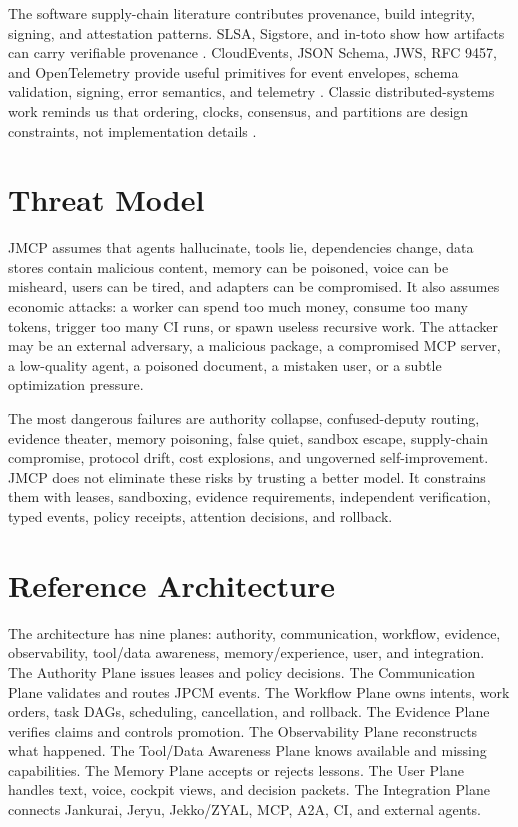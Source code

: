\documentclass[10pt,journal,onecolumn]{IEEEtran}
\begin{document}
The software supply-chain literature contributes provenance, build integrity, signing, and attestation patterns. SLSA, Sigstore, and in-toto show how artifacts can carry verifiable provenance \cite{slsa,sigstore,intoto}. CloudEvents, JSON Schema, JWS, RFC 9457, and OpenTelemetry provide useful primitives for event envelopes, schema validation, signing, error semantics, and telemetry \cite{cloudevents,jsonschema,rfc7515,rfc9457,opentelemetry}. Classic distributed-systems work reminds us that ordering, clocks, consensus, and partitions are design constraints, not implementation details \cite{lamport,paxos,raft,cap}.

\section{Threat Model}
JMCP assumes that agents hallucinate, tools lie, dependencies change, data stores contain malicious content, memory can be poisoned, voice can be misheard, users can be tired, and adapters can be compromised. It also assumes economic attacks: a worker can spend too much money, consume too many tokens, trigger too many CI runs, or spawn useless recursive work. The attacker may be an external adversary, a malicious package, a compromised MCP server, a low-quality agent, a poisoned document, a mistaken user, or a subtle optimization pressure.

The most dangerous failures are authority collapse, confused-deputy routing, evidence theater, memory poisoning, false quiet, sandbox escape, supply-chain compromise, protocol drift, cost explosions, and ungoverned self-improvement. JMCP does not eliminate these risks by trusting a better model. It constrains them with leases, sandboxing, evidence requirements, independent verification, typed events, policy receipts, attention decisions, and rollback.

\section{Reference Architecture}
The architecture has nine planes: authority, communication, workflow, evidence, observability, tool/data awareness, memory/experience, user, and integration. The Authority Plane issues leases and policy decisions. The Communication Plane validates and routes JPCM events. The Workflow Plane owns intents, work orders, task DAGs, scheduling, cancellation, and rollback. The Evidence Plane verifies claims and controls promotion. The Observability Plane reconstructs what happened. The Tool/Data Awareness Plane knows available and missing capabilities. The Memory Plane accepts or rejects lessons. The User Plane handles text, voice, cockpit views, and decision packets. The Integration Plane connects Jankurai, Jeryu, Jekko/ZYAL, MCP, A2A, CI, and external agents.
\end{document}
